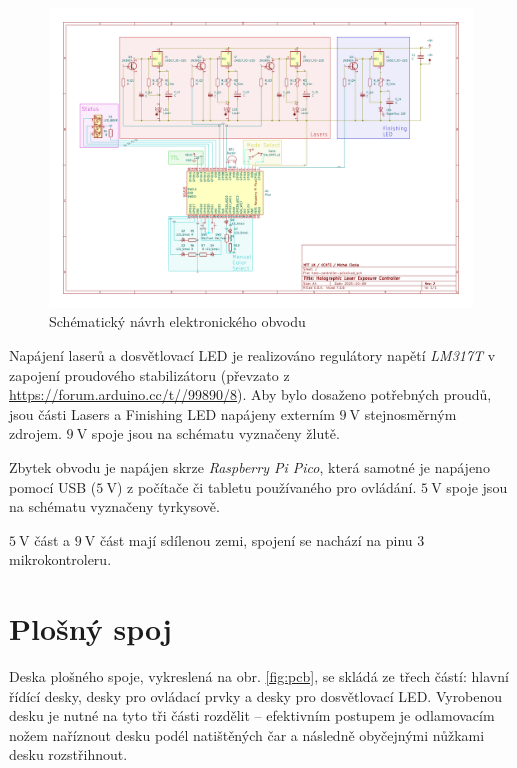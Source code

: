 \documentclass[twoside,project,skipblank]{../MFFPrace}
\begin{document}
\begin{landscape}
    \centering
    \begin{figure}
        \includegraphics[width=19.3cm]{../../HoloControl-PCB/holo-controller-schema.pdf}
        \caption{Schématický návrh elektronického obvodu}
        \label{fig:schema}
    \end{figure}
\end{landscape}

Napájení laserů a dosvětlovací LED je realizováno regulátory napětí \textit{LM317T} v zapojení proudového stabilizátoru (převzato z \url{https://forum.arduino.cc/t//99890/8}). Aby bylo dosaženo potřebných proudů, jsou části \textsf{Lasers} a \textsf{Finishing LED} napájeny externím $9\:\text{V}$ stejnosměrným zdrojem. $9\:\text{V}$ spoje jsou na schématu vyznačeny žlutě.

Zbytek obvodu je napájen skrze \textit{Raspberry Pi Pico}, která samotné je napájeno pomocí USB ($5\:\text{V}$) z počítače či tabletu používaného pro ovládání. $5\:\text{V}$ spoje jsou na schématu vyznačeny tyrkysově.

$5\:\text{V}$ část a $9\:\text{V}$ část mají sdílenou zemi, spojení se nachází na pinu 3 mikrokontroleru.

\section{Plošný spoj}
Deska plošného spoje, vykreslená na obr. \ref{fig:pcb}, se skládá ze třech částí: hlavní řídící desky, desky pro ovládací prvky a desky pro dosvětlovací LED. Vyrobenou desku je nutné na tyto tři části rozdělit -- efektivním postupem je odlamovacím nožem naříznout desku podél natištěných čar a následně obyčejnými nůžkami desku rozstřihnout.
\end{document}
